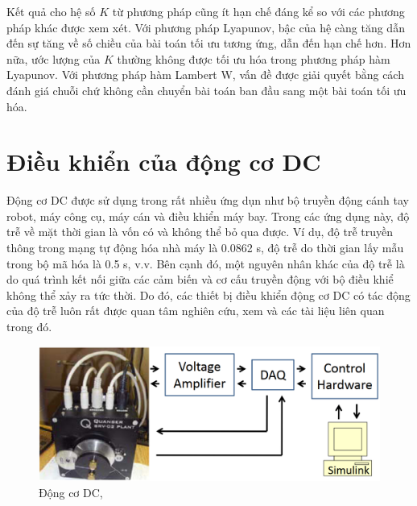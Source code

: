 \begin{vd}
Kết quả cho hệ số $K$ từ phương pháp cũng ít hạn chế đáng kể so với các phương pháp khác được xem xét. Với phương pháp Lyapunov,  bậc của hệ càng tăng dẫn đến sự tăng về số chiều của bài toán tối ưu tương ứng, dẫn đến hạn chế hơn. Hơn nữa, ước lượng của $K$ thường không được tối ưu hóa trong phương pháp hàm Lyapunov. Với phương pháp hàm Lambert W, vấn đề được giải quyết bằng cách đánh giá chuỗi chứ không cần chuyển bài toán ban đầu sang một bài toán tối ưu hóa.
\end{vd}

\section{Điều khiển của động cơ DC}
Động cơ DC được sử dụng trong rất nhiều ứng dụn như bộ truyền động cánh tay robot, máy công cụ, máy cán và điều khiển máy bay. Trong các ứng dụng này, độ trễ về mặt thời gian là vốn có và không thể bỏ qua được. Ví dụ, độ trễ truyền thông trong mạng tự động hóa nhà máy là 0.0862 s, độ trễ do thời gian lấy mẫu trong bộ mã hóa là 0.5 s, v.v. Bên cạnh đó, một nguyên nhân khác của độ trễ là do quá trình kết nối giữa các cảm biến và cơ cấu truyền động với bộ điều khiể không thể xảy ra tức thời. Do đó, các thiết bị điều khiển động cơ DC có tác động của độ trễ luôn rất được quan tâm nghiên cứu, xem \cite{Dua12,Le.et.al16} và các tài liệu liên quan trong đó.

\begin{figure}[h!]
	\centering
	\includegraphics[scale= 0.5]{"./Hinh/DCmotor"}
	\caption[]{Động cơ DC, \cite{Dua12}}
	\label{fig:DCmotor}
\end{figure}

